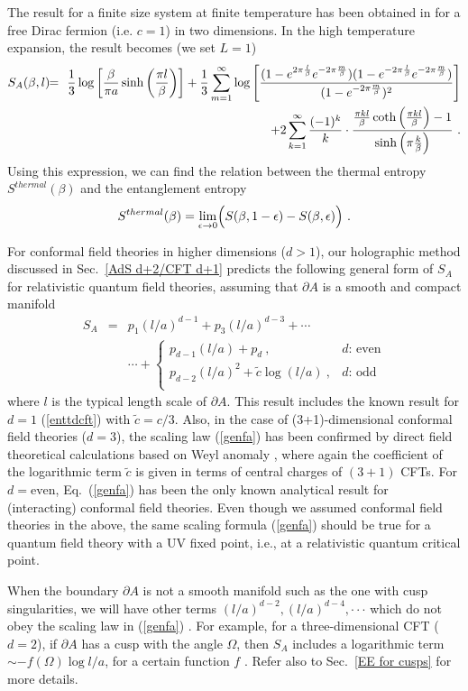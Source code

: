 \documentclass[12pt]{article}
\def\ep{{\epsilon}}
\def\frac#1#2{{#1\over #2}}
\def\de{\partial}
\def\f {\frac}
\def\ti{\tilde}
\def\ddd{\cdot\cdot\cdot}
\def\no{\nonumber \\}
\def\ep{\epsilon}
\def\ep{{\epsilon}}
\def\frac#1#2{{#1\over #2}}
\def\be{\begin{equation}}
\def\ee{\end{equation}}
\def\ba{\begin{eqnarray}}
\def\ea{\end{eqnarray}}
\begin{document}
The result for a finite size system at finite temperature has been obtained
in \cite{Azeyanagi:2007bj} for a free Dirac fermion (i.e. $c=1$) in two dimensions.
In the high temperature expansion, the result becomes (we set $L=1$)
\ba S_{A}(\beta,l)
\!\!&=&\!\!
\f{1}{3}\log\left[\f{\beta}{\pi
 a}\sinh\left(\f{\pi
l}{\beta}\right)\right]+\f{1}{3}\sum_{m=1}^\infty
\log\left[\f{(1-e^{2\pi \f{l}{\beta}}e^{-2\pi \f{m}{\beta}
})(1-e^{-2\pi \f{l}{\beta}}e^{-2\pi \f{m}{\beta}})}{(1-e^{-2\pi
\f{m}{\beta}})^2}\right]\no  &&\quad + 2\sum_{k=1}^\infty
\f{(-1)^{k}}{k}\cdot\f{\f{\pi kl}{\beta}\coth\left(\f{\pi
kl}{\beta}\right)-1}{\sinh\left(\pi \f{k}{\beta}\right)} \ .
\label{toth}\ea
Using this expression, we can find the relation between
the thermal entropy $S^{thermal}(\beta)$ and the entanglement entropy
\be
S^{thermal}(\beta)=\lim_{\ep\to 0}\Bigl(S(\beta,1-\ep)-S(\beta,\ep)\Bigr) \ .
\ee


For conformal field theories in higher dimensions ($d>1$),
our holographic method discussed in Sec.\ \ref{AdS d+2/CFT d+1}
predicts the following general form of $S_A$
for relativistic quantum field theories,
assuming that $\de A$ is a smooth and compact
manifold
\ba
S_A \!\!&=&\!\!
  p_1  \left(l/a\right)^{d-1}
+ p_3 \left(l/a \right)^{d-3}
+\cdots   \no
&&
\cdots +\left\{
\begin{array}{ll}
\displaystyle p_{d-1}\left(l/a\right) + p_d  \ , &
 \mbox{$d$: even}    \\
\displaystyle p_{d-2} \left(l/a\right)^{2} + \ti{c} \log
\left(l/a\right) \ ,
&  \mbox{$d$: odd}    \\
\end{array}
\right.\label{genfa}
\ea
where $l$ is the typical length scale of $\partial A$.
This result includes the known result for $d=1$ (\ref{enttdcft}) with $\tilde{c}=c/3$.
Also, in the case of (3+1)-dimensional
conformal field theories ($d=3$),
the scaling law (\ref{genfa})
has been confirmed by direct field theoretical calculations
based on Weyl anomaly \cite{RuTaL},
where again the coefficient of the logarithmic term $\tilde{c}$
is given in terms of central charges of $(3+1)$ CFTs.
For $d=\mathrm{even}$,
Eq.\ (\ref{genfa}) has been the only known analytical result
for (interacting) conformal field theories.
Even though we assumed conformal field theories in the above, the same
scaling formula (\ref{genfa}) should be true for a quantum field theory
with a UV fixed point, i.e.,
at a relativistic quantum critical point.

When the boundary $\de A$ is not a smooth manifold such as the one with cusp
singularities, we will have other terms $(l/a)^{d-2},(l/a)^{d-4},\ddd$
which do not obey the scaling law in (\ref{genfa}) \cite{Fu}. For example, for a three-dimensional
CFT ($d=2$), if $\de A$ has a cusp with the angle $\Omega$, then $S_A$ includes a
logarithmic term $\sim -f(\Omega)\log l/a$, for a certain function $f$
\cite{Casini:2006hu,Casini:2008as}. Refer also to
Sec.\ \ref{EE for cusps} for more details.
\end{document}
